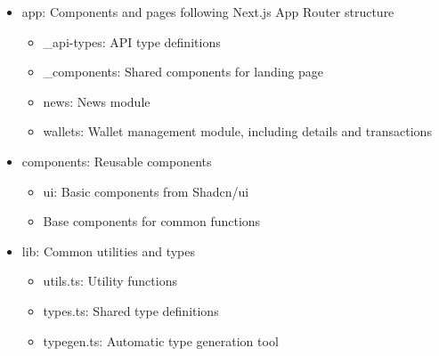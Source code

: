 \begin{itemize}
\item app: Components and pages following Next.js App Router structure
    \begin{itemize}
    \item \_api-types: API type definitions
    \item \_components: Shared components for landing page
    \item news: News module
    \item wallets: Wallet management module, including details and transactions
    \end{itemize}
\item components: Reusable components
    \begin{itemize}
    \item ui: Basic components from Shadcn/ui
    \item Base components for common functions
    \end{itemize}
\item lib: Common utilities and types
    \begin{itemize}
    \item utils.ts: Utility functions
    \item types.ts: Shared type definitions
    \item typegen.ts: Automatic type generation tool
    \end{itemize}

\end{itemize}
